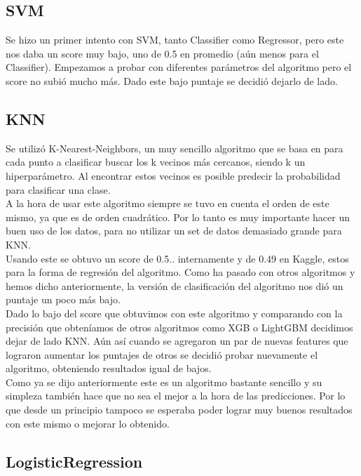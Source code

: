\documentclass[a4paper]{article}
\begin{document}
    \subsection{SVM}\label{subsec:svm}
    
        
    
        Se hizo un primer intento con SVM, tanto Classifier como Regressor, pero este nos daba un score muy bajo, uno de 0.5 en promedio (aún menos para el Classifier). Empezamos a probar con diferentes parámetros del algoritmo pero el score no subió mucho más. Dado este bajo puntaje se decidió dejarlo de lado.
        
    \subsection{KNN}\label{subsec:knn}
    
        Se utilizó K-Nearest-Neighbors, un muy sencillo algoritmo que se basa en para cada punto a clasificar buscar los k vecinos más cercanos, siendo k un hiperparámetro. Al encontrar estos vecinos es posible predecir la probabilidad para clasificar una clase.\\
        A la hora de usar este algoritmo siempre se tuvo en cuenta el orden de este mismo, ya que es de orden cuadrático. Por lo tanto es muy importante hacer un buen uso de los datos, para no utilizar un set de datos demasiado grande para KNN.\\
        Usando este se obtuvo un score de 0.5.. internamente y de 0.49 en Kaggle, estos para la forma de regresión del algoritmo. Como ha pasado con otros algoritmos y hemos dicho anteriormente, la versión de clasificación del algoritmo nos dió un puntaje un poco más bajo.\\
        Dado lo bajo del score que obtuvimos con este algoritmo y comparando con la precisión que obteníamos de otros algoritmos como XGB o LightGBM decidimos dejar de lado KNN. Aún así cuando se agregaron un par de nuevas features que lograron aumentar los puntajes de otros se decidió probar nuevamente el algoritmo, obteniendo resultados igual de bajos.\\
        Como ya se dijo anteriormente este es un algoritmo bastante sencillo y su simpleza también hace que no sea el mejor a la hora de las predicciones. Por lo que desde un principio tampoco se esperaba poder lograr muy buenos resultados con este mismo o mejorar lo obtenido.\\

    \subsection{LogisticRegression}\label{subsec:LogisticRegression}
    
\end{document}
